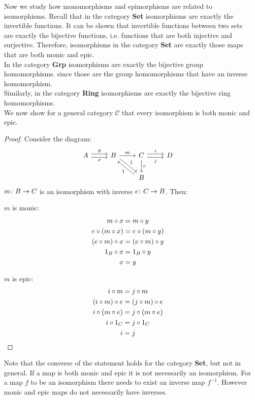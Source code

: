 Now we study how monomorphisms and epimorphisms are related to isomorphisms.
Recall that in the category \textbf{Set} isomorphisms are exactly the invertible functions.
It can be shown that invertible functions between two sets are
exactly the bijective functions, i.e. functions that are both injective and surjective.
Therefore, isomorphisms in the category \textbf{Set} are exactly those maps that are both monic and epic.\\
In the category \textbf{Grp} isomorphisms are exactly the bijective group homomorphisms.
since those are the group homomorphisms that have an inverse homomorphism.\\
Similarly, in the category \textbf{Ring} isomorphisms are exactly the bijective ring homomorphisms.\\
We now show for a general category $\mathscr{C}$ that every isomorphism is both monic and epic.
\begin{proof}
  Consider the diagram:
  \[
    \begin{tikzcd}
      A \arrow[r,shift left, "y"] \arrow[r,shift right,swap,"x"] &
      B \arrow[dr, shift left, "1"]  \arrow{r}{m}  &
      C \arrow{d}{e} \arrow[r,shift left, "i"] \arrow[r,shift right,swap,"j"] & D\\
      &  & B \arrow[ul, shift left, "1"]&
    \end{tikzcd}
  \]
  $m \from B \to C$ is an isomorphism with inverse $e \from C \to B$.
  Then:\\
  \begin{minipage}{.5\linewidth}
    \vspace{4mm}
    \centering $m$ is monic:
    \[
      \begin{aligned}
        m \mathbin{\circ} x &= m \mathbin{\circ} y\\
        e \mathbin{\circ} (m \mathbin{\circ} x) &= e \mathbin{\circ} (m \mathbin{\circ} y)\\
        (e \mathbin{\circ} m) \mathbin{\circ} x &= (e \mathbin{\circ} m) \mathbin{\circ} y\\
        1_B \mathbin{\circ} x &= 1_B \mathbin{\circ} y\\
        x &= y
      \end{aligned}
    \]
  \end{minipage}%
  \begin{minipage}{.5\linewidth}
    \vspace{4mm}
    \centering $m$ is epic:
    \[
      \begin{aligned}
        i \mathbin{\circ} m &= j \mathbin{\circ} m \\
        (i \mathbin{\circ} m) \mathbin{\circ} e &= (j \mathbin{\circ} m) \mathbin{\circ} e\\
        i \mathbin{\circ} (m \mathbin{\circ} e) &= j \mathbin{\circ} (m \mathbin{\circ} e)\\
        i \mathbin{\circ} 1_C &= j \mathbin{\circ} 1_C\\
        i &= j
      \end{aligned}
    \]
  \end{minipage}%
\end{proof}
Note that the converse of the statement holds for the category \textbf{Set}, but not in general.
If a map is both monic and epic it is not necessarily an isomorphism.
For a map $f$ to be an isomorphism there needs to exist an inverse map $f^{-1}$.
However monic and epic maps do not necessarily have inverses.\\[1mm]


